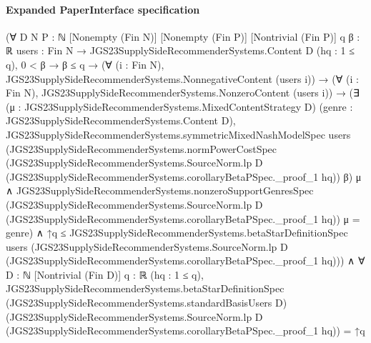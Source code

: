 \documentclass[10pt]{article}
\begin{document}
\paragraph{Expanded PaperInterface specification}
\begin{ReviewVerbatim}
(∀ {D N P : ℕ} [Nonempty (Fin N)] [Nonempty (Fin P)] [Nontrivial (Fin P)] {q β : ℝ}
    {users : Fin N → JGS23SupplySideRecommenderSystems.Content D} (hq : 1 ≤ q),
    0 < β →
      β ≤ q →
        (∀ (i : Fin N), JGS23SupplySideRecommenderSystems.NonnegativeContent (users i)) →
          (∀ (i : Fin N), JGS23SupplySideRecommenderSystems.NonzeroContent (users i)) →
            (∃ (μ : JGS23SupplySideRecommenderSystems.MixedContentStrategy D) (genre :
                JGS23SupplySideRecommenderSystems.Content D),
                JGS23SupplySideRecommenderSystems.symmetricMixedNashModelSpec users
                    (JGS23SupplySideRecommenderSystems.normPowerCostSpec
                      (JGS23SupplySideRecommenderSystems.SourceNorm.lp D
                        (JGS23SupplySideRecommenderSystems.corollaryBetaPSpec._proof_1 hq))
                      β)
                    μ ∧
                  JGS23SupplySideRecommenderSystems.nonzeroSupportGenresSpec
                      (JGS23SupplySideRecommenderSystems.SourceNorm.lp D
                        (JGS23SupplySideRecommenderSystems.corollaryBetaPSpec._proof_1 hq))
                      μ =
                    {genre}) ∧
              ↑q ≤
                JGS23SupplySideRecommenderSystems.betaStarDefinitionSpec users
                  (JGS23SupplySideRecommenderSystems.SourceNorm.lp D
                    (JGS23SupplySideRecommenderSystems.corollaryBetaPSpec._proof_1 hq))) ∧
  ∀ {D : ℕ} [Nontrivial (Fin D)] {q : ℝ} (hq : 1 ≤ q),
    JGS23SupplySideRecommenderSystems.betaStarDefinitionSpec (JGS23SupplySideRecommenderSystems.standardBasisUsers D)
        (JGS23SupplySideRecommenderSystems.SourceNorm.lp D
          (JGS23SupplySideRecommenderSystems.corollaryBetaPSpec._proof_1 hq)) =
      ↑q
\end{ReviewVerbatim}
\end{document}

